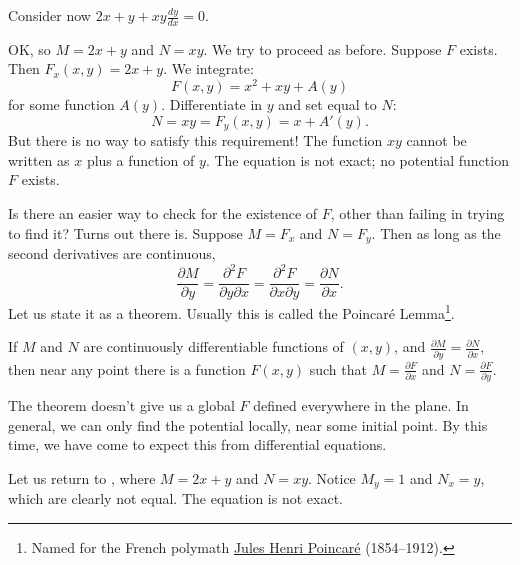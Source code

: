 \begin{example} \label{exact:example:2xyandxy}
Consider now $2x+y + xy \frac{dy}{dx} = 0$.

OK\@, so $M = 2x+y$ and $N=xy$.  We try to proceed as before.
Suppose 
$F$ exists.  Then $F_x (x,y) = 2x+y$.
We integrate:
\begin{equation*}
F(x,y) = x^2 + xy + A(y)
\end{equation*}
for some function $A(y)$.  Differentiate in $y$ and set equal to $N$:
\begin{equation*}
N = xy = F_y (x,y) = x+A'(y) .
\end{equation*}
But there is no way to satisfy this requirement!  The function $xy$ cannot
be written as $x$ plus a function of $y$.  The equation is not
exact; no potential function $F$ exists.
\end{example}

Is there an easier way to check for the existence of $F$, other than failing
in trying to
find it?  Turns out there is.  Suppose
$M = F_x$ and
$N = F_y$.  Then
as long as the second derivatives are continuous,
\begin{equation*}
\frac{\partial M}{\partial y}
=
\frac{\partial^2 F}{\partial y \partial x}
=
\frac{\partial^2 F}{\partial x \partial y}
=
\frac{\partial N}{\partial x} .
\end{equation*}
Let us state it as
a theorem.  Usually this is called the Poincar\'e Lemma\footnote{Named for the French polymath
\href{https://en.wikipedia.org/wiki/Henri_Poincar\%C3\%A9}{Jules Henri
Poincar\'e} (1854--1912).}.

\begin{theorem}[Poincar\'e]
If $M$ and $N$ are continuously differentiable functions of $(x,y)$, and
$\frac{\partial M}{\partial y} = \frac{\partial N}{\partial x}$,
then near any point there is a function $F(x,y)$
such that
$M = \frac{\partial F}{\partial x}$ and
$N = \frac{\partial F}{\partial y}$.
\end{theorem}

The theorem doesn't give us a global $F$ defined everywhere in the plane.  In
general, we can only find the potential locally, near some initial point.
By this time, we have come to expect this from differential
equations.

Let us return to , where $M = 2x + y$ and $N = xy$.  
Notice 
$M_y = 1$ and  $N_x =
y$, which are clearly not equal.  The equation is not exact.

